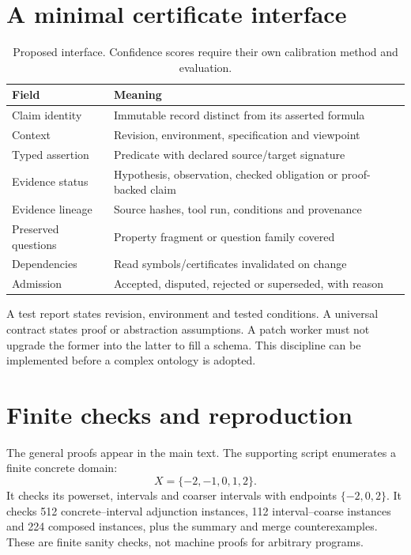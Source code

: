 \documentclass[11pt]{article}
\begin{document}
\clearpage\appendix
\section{A minimal certificate interface}
\begin{table}[ht]\small\centering
\begin{tabularx}{\linewidth}{@{}lX@{}}\toprule
Field & Meaning \\\midrule
Claim identity & Immutable record distinct from its asserted formula \\
Context & Revision, environment, specification and viewpoint \\
Typed assertion & Predicate with declared source/target signature \\
Evidence status & Hypothesis, observation, checked obligation or proof-backed claim \\
Evidence lineage & Source hashes, tool run, conditions and provenance \\
Preserved questions & Property fragment or question family covered \\
Dependencies & Read symbols/certificates invalidated on change \\
Admission & Accepted, disputed, rejected or superseded, with reason \\\bottomrule
\end{tabularx}\caption{Proposed interface. Confidence scores require their own calibration method and evaluation.}\end{table}

A test report states revision, environment and tested conditions. A universal contract states proof or abstraction assumptions. A patch worker must not upgrade the former into the latter to fill a schema. This discipline can be implemented before a complex ontology is adopted.

\section{Finite checks and reproduction}
The general proofs appear in the main text. The supporting script enumerates a finite concrete domain:
\[X=\{-2,-1,0,1,2\}.\]
It checks its powerset, intervals and coarser intervals with endpoints $\{-2,0,2\}$. It checks 512 concrete--interval adjunction instances, 112 interval--coarse instances and 224 composed instances, plus the summary and merge counterexamples. These are finite sanity checks, not machine proofs for arbitrary programs.
\end{document}
